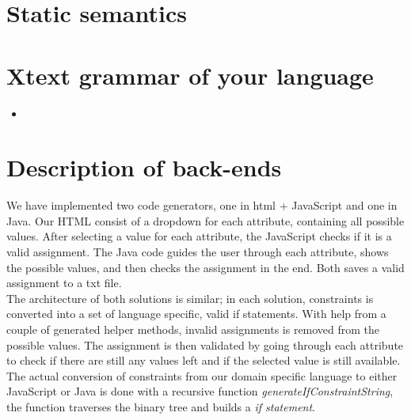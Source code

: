 \documentclass[paper=a4, fontsize=11pt]{scrartcl} %
\numberwithin{equation}{section} %
\numberwithin{figure}{section} %
\numberwithin{table}{section} %
\newcommand{\java}[2]{
\begin{itemize}
\item[]
\end{itemize}
}
\begin{document}
\section{Static semantics}



\section{Xtext grammar of your language}
\java{../configproject/xtext/org.xtext.example.smdpdsl/src/org/xtext/example/mydsl/SmdpDsl.xtext}{Xtext Grammar}

\section{Description of back-ends}
We have implemented two code generators, one in html + JavaScript and one in Java. Our HTML consist of a dropdown for each attribute, containing all possible values. After selecting a value for each attribute, the JavaScript checks if it is a valid assignment. The Java code guides the user through each attribute, shows the possible values, and then checks the assignment in the end. Both saves a valid assignment to a txt file.\\

The architecture of both solutions is similar; in each solution, constraints is converted into a set of language specific, valid if statements. With help from a couple of generated helper methods, invalid assignments is removed from the possible values. The assignment is then validated by going through each attribute to check if there are still any values left and if the selected value is still available.\\
The actual conversion of constraints from our domain specific language to either JavaScript or Java is done with a recursive function \textit{generateIfConstraintString}, the function traverses the binary tree and builds a \textit{if statement}. 
\end{document}
